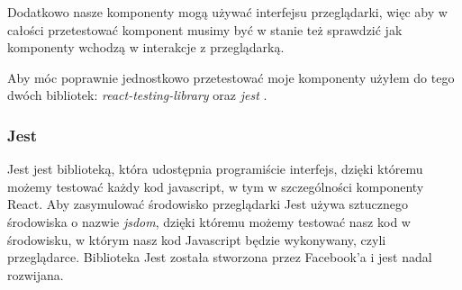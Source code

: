 Dodatkowo nasze komponenty mogą używać interfejsu przeglądarki, więc aby w całości przetestować komponent musimy być w stanie też sprawdzić jak komponenty wchodzą w interakcje z przeglądarką.

Aby móc poprawnie jednostkowo przetestować moje komponenty użyłem do tego dwóch bibliotek: \emph{react-testing-library} \cite{ref_rtl_doc} oraz \emph{jest} \cite{ref_jest_doc}.

\subsubsection{Jest} Jest jest biblioteką, która udostępnia programiście interfejs, dzięki któremu możemy testować każdy kod javascript, w tym w szczególności komponenty React. Aby zasymulować środowisko przeglądarki Jest używa sztucznego środowiska o nazwie \emph{jsdom}, dzięki któremu możemy testować nasz kod w środowisku, w którym nasz kod Javascript będzie wykonywany, czyli przeglądarce. Biblioteka Jest została stworzona przez Facebook'a i jest nadal rozwijana. 

